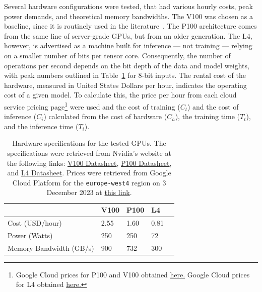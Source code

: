 \documentclass[conference]{IEEEtran}
\begin{document}
{Several hardware configurations were tested, that had various hourly costs, peak power demands, and theoretical memory bandwidths. The V100 was chosen as a baseline, since it is routinely used in the literature~\cite{svedin2021benchmarking,xu2018deep}. The P100 architecture comes from the same line of server-grade GPUs, but from an older generation. The L4, however, is advertised as a machine built for inference --- not training --- relying on a smaller number of bits per tensor core. Consequently, the number of operations per second depends on the bit depth of the data and model weights, with peak numbers outlined in Table~\ref{tab:hardware} for 8-bit inputs. The rental cost of the hardware, measured in United States Dollars per hour, indicates the operating cost of a given model. To calculate this, the price per hour from each cloud service pricing page\footnote{Google Cloud prices for P100 and V100 obtained \href{https://cloud.google.com/compute/gpus-pricing}{here.} Google Cloud prices for L4 obtained \href{https://cloud.google.com/compute/vm-instance-pricing\#accelerator-optimised}{here.}} were used and the cost of training ($C_{t}$) and the cost of inference ($C_{i}$) calculated from the cost of hardware ($C_{h}$), the training time ($T_{t}$), and the inference time ($T_{i}$).
\begin{table}[h]
    \centering
    \begin{tabular}{lllll}
    \toprule
                            & V100   & P100   & L4    &  \\
    \midrule
    Cost (USD/hour)         & 2.55   & 1.60   & 0.81   &  \\
    Power (Watts)           & 250    & 250    & 72    &  \\
    Memory Bandwidth (GB/s) & 900    & 732    & 300   &  \\
    \bottomrule
    \end{tabular}
    \caption{Hardware specifications for the tested GPUs. The specifications were retrieved from Nvidia's website at the following links: 
    \href{https://images.nvidia.com/content/technologies/volta/pdf/volta-v100-datasheet-update-us-1165301-r5.pdf}{V100 Datasheet},
    \href{https://images.nvidia.com/content/tesla/pdf/nvidia-tesla-p100-PCIe-datasheet.pdf}{P100 Datasheet}, and
    \href{https://nvdam.widen.net/s/rvq98gbwsw/l4-datasheet-2595652}{L4 Datasheet}. Prices were retrieved from Google Cloud Platform for the \texttt{europe-west4} region on 3 December 2023 at \href{https://cloud.google.com/pricing/list}{this link}.
    }
    \label{tab:hardware}
\end{table}


}
\end{document}
